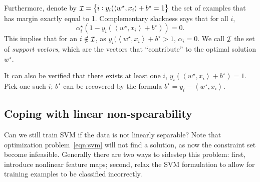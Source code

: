 \documentclass{article}
\newtheorem{lemma}{Lemma}
\DeclareMathOperator*{\Ical}{{\cal I}}
\DeclareMathOperator*{\minimize}{{\rm minimize}}
\DeclareMathOperator*{\st}{{\rm s.t.}}
\newcommand{\inner}[2]{\left\langle #1,#2 \right\rangle}
\begin{document}
Furthermore, denote by $\Ical = \cbr{i: y_i(\inner{w^\star}{x_i} + b^\star = 1}$ the set of examples that has margin exactly equal to 1.
Complementary slackness says that for all $i$,
\[ \alpha_i^\star (1 - y_i(\inner{w^\star}{x_i} + b^\star)) = 0. \]
This implies that for an $i \notin \Ical$, as $y_i(\inner{w^\star}{x_i} + b^\star > 1$, $\alpha_i = 0$. We call $\Ical$ the set of {\em support vectors}, which are the vectors that ``contribute'' to the optimal solution $w^\star$.

It can also be verified that there exists at least one $i$, $y_i(\inner{w^\star}{x_i} + b^\star) = 1$. Pick one such $i$; $b^\star$ can be recovered by the formula $b^\star = y_i - \inner{w^\star}{x_i}$.





\subsection{Coping with linear non-spearability}
Can we still train SVM if the data is not linearly separable? Note that optimization problem~\eqref{eqn:svm} will not find a solution, as now the constraint set become infeasible. Generally there are two ways to sidestep this problem: first, introduce nonlinear feature maps; second, relax the SVM formulation to allow for training examples
to be classified incorrectly.
\end{document}
